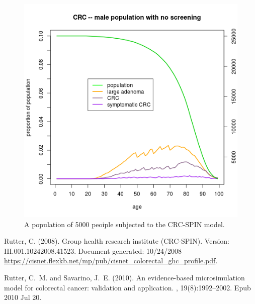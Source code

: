 \documentclass[11pt]{article}
\begin{document}
\begin{figure}[tbhp]
  \centering
  \includegraphics[totalheight=9cm]{./figs/DukesCrcSpinModel.png}
  \caption{A population of 5000 peoiple subjected to the CRC-SPIN model.}
  \label{figure:DukesCrcSpinModel.png}
\end{figure}


\clearpage
\begin{thebibliography}{}

%
%
  
Rutter, C. (2008).
\newblock Group health research institute ({CRC-SPIN}).
\newblock Version: HI.001.10242008.41523. Document generated: 10/24/2008
  \url{https://cisnet.flexkb.net/mp/pub/cisnet_colorectal_ghc_profile.pdf}.

Rutter, C.~M. and Savarino, J.~E. (2010).
\newblock An evidence-based microsimulation model for colorectal cancer:
  validation and application.
, 19(8):1992--2002.
\newblock Epub 2010 Jul 20.
\end{thebibliography}


\appendix
\end{document}
